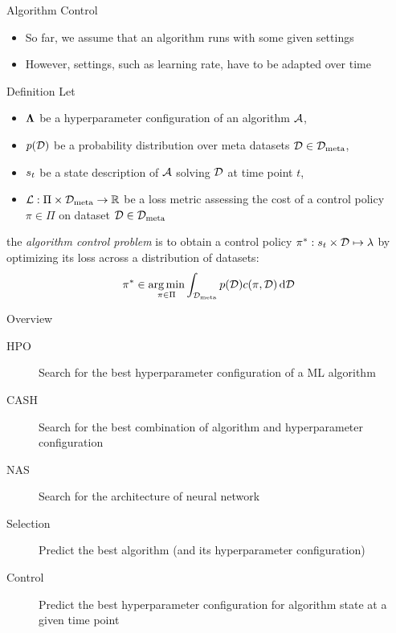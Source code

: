 \begin{frame}[c]{Algorithm Control}

\begin{itemize}
	\item So far, we assume that an algorithm runs with some given settings
	\item However, settings, such as learning rate, have to be adapted over time
\end{itemize}

\begin{block}{Definition}
	Let 
	\begin{itemize}
		\item $\mathbf{\Lambda}$ be a hyperparameter configuration of an algorithm $\mathcal{A}$,
		\pause
		\item $p(\mathcal{D})$ be a probability distribution over meta datasets $\mathcal{D} \in \mathcal{D}_{\text{meta}}$,
		\pause
		\item $s_t$ be a state description of $\mathcal{A}$ solving $\mathcal{D}$ at time point $t$,
		\pause
		\item $\mathcal{L}: \Pi \times \mathcal{D}_{\text{meta}} \to \mathbb{R}$ be a loss metric assessing the \alert{cost of a control policy $\pi \in \Pi$} on dataset $\mathcal{D} \in \mathcal{D}_{\text{meta}}$
	\end{itemize}
	
	\pause
	the \emph{algorithm control problem} is to obtain a control policy $\pi^* : s_t \times \mathcal{D} \mapsto \mathbf{\lambda}$ by optimizing its loss across a distribution of datasets:
	\begin{equation}
	\pi^* \in \operatorname*{arg\,min}_{\pi \in \Pi} \int_{\mathcal{D}_{\text{meta}}} p(\mathcal{D}) c(\pi, \mathcal{D}) \mathop{}\!\mathrm{d} \mathcal{D} \nonumber
	\end{equation}
\end{block}

\end{frame}
\begin{frame}[c]{Overview}

\begin{description}
	\item[HPO] Search for the best hyperparameter configuration of a ML algorithm
	\item[CASH] Search for the best combination of algorithm and hyperparameter configuration
	\item[NAS] Search for the architecture of neural network
	\item[Selection] Predict the best algorithm (and its hyperparameter configuration)
	\item[Control] Predict the best hyperparameter configuration for algorithm state at a given time point 
\end{description}

\end{frame}

